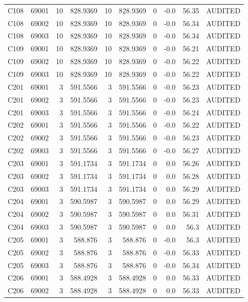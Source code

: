 \begin{tabular}{lrrrrrrrrr}
C108 & 69001 & 10 & 828.9369 & 10 & 828.9369 & 0 & -0.0 & 56.35 & AUDITED \\
C108 & 69002 & 10 & 828.9369 & 10 & 828.9369 & 0 & -0.0 & 56.34 & AUDITED \\
C108 & 69003 & 10 & 828.9369 & 10 & 828.9369 & 0 & -0.0 & 56.34 & AUDITED \\
C109 & 69001 & 10 & 828.9369 & 10 & 828.9369 & 0 & -0.0 & 56.21 & AUDITED \\
C109 & 69002 & 10 & 828.9369 & 10 & 828.9369 & 0 & -0.0 & 56.22 & AUDITED \\
C109 & 69003 & 10 & 828.9369 & 10 & 828.9369 & 0 & -0.0 & 56.22 & AUDITED \\
C201 & 69001 & 3 & 591.5566 & 3 & 591.5566 & 0 & -0.0 & 56.23 & AUDITED \\
C201 & 69002 & 3 & 591.5566 & 3 & 591.5566 & 0 & -0.0 & 56.23 & AUDITED \\
C201 & 69003 & 3 & 591.5566 & 3 & 591.5566 & 0 & -0.0 & 56.24 & AUDITED \\
C202 & 69001 & 3 & 591.5566 & 3 & 591.5566 & 0 & -0.0 & 56.22 & AUDITED \\
C202 & 69002 & 3 & 591.5566 & 3 & 591.5566 & 0 & -0.0 & 56.23 & AUDITED \\
C202 & 69003 & 3 & 591.5566 & 3 & 591.5566 & 0 & -0.0 & 56.27 & AUDITED \\
C203 & 69001 & 3 & 591.1734 & 3 & 591.1734 & 0 & 0.0 & 56.26 & AUDITED \\
C203 & 69002 & 3 & 591.1734 & 3 & 591.1734 & 0 & 0.0 & 56.28 & AUDITED \\
C203 & 69003 & 3 & 591.1734 & 3 & 591.1734 & 0 & 0.0 & 56.29 & AUDITED \\
C204 & 69001 & 3 & 590.5987 & 3 & 590.5987 & 0 & 0.0 & 56.29 & AUDITED \\
C204 & 69002 & 3 & 590.5987 & 3 & 590.5987 & 0 & 0.0 & 56.31 & AUDITED \\
C204 & 69003 & 3 & 590.5987 & 3 & 590.5987 & 0 & 0.0 & 56.3 & AUDITED \\
C205 & 69001 & 3 & 588.876 & 3 & 588.876 & 0 & -0.0 & 56.3 & AUDITED \\
C205 & 69002 & 3 & 588.876 & 3 & 588.876 & 0 & -0.0 & 56.33 & AUDITED \\
C205 & 69003 & 3 & 588.876 & 3 & 588.876 & 0 & -0.0 & 56.34 & AUDITED \\
C206 & 69001 & 3 & 588.4928 & 3 & 588.4928 & 0 & 0.0 & 56.33 & AUDITED \\
C206 & 69002 & 3 & 588.4928 & 3 & 588.4928 & 0 & 0.0 & 56.33 & AUDITED \\

\end{tabular}
